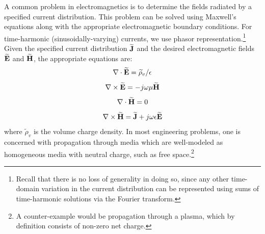 

\label{m0195_Magnetic_Vector_Potential} %

A common problem in electromagnetics is to determine the fields radiated by a specified current distribution.
This problem can be solved using Maxwell's equations
along with the appropriate electromagnetic boundary conditions.
For time-harmonic 
(sinusoidally-varying) currents, we use phasor representation.\footnote{Recall that there is no loss of generality in doing so, since any other time-domain variation in the current distribution can be represented using sums of time-harmonic solutions via the Fourier transform.}
Given the specified current distribution $\widetilde{\bf J}$ and the desired electromagnetic fields $\widetilde{\bf E}$ and $\widetilde{\bf H}$, the
appropriate equations are:
%
\begin{equation}
\nabla \cdot \widetilde{\bf E} = \widetilde{\rho}_v/\epsilon
\label{m0195_eMDE0}
\end{equation}
%
\begin{equation}
\nabla \times  \widetilde{\bf E} = -j\omega\mu\widetilde{\bf H} 
\label{m0195_eMCE}
\end{equation}
%
\begin{equation}
\nabla \cdot \widetilde{\bf H} = 0 
\label{m0195_eMDH}
\end{equation}
%
\begin{equation}
\nabla \times \widetilde{\bf H}  = \widetilde{\bf J} + j\omega\epsilon\widetilde{\bf E}
\label{m0195_eMCH} 
\end{equation}
%
where $\widetilde{\rho}_v$ is the volume charge density.
In most engineering problems, one is concerned with propagation through media which are well-modeled as homogeneous media with neutral charge, such as free space.\footnote{A counter-example would be propagation through a plasma,
which by definition consists of non-zero net charge.}
